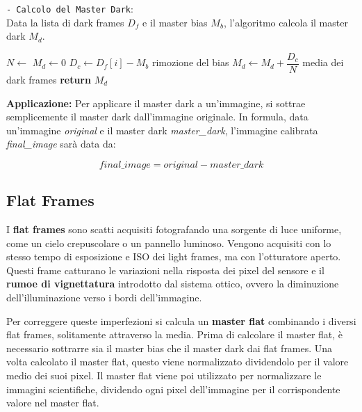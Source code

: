 \begin{algorithm}[H]
    \caption{\texttt{- Calcolo del Master Dark}:\\ Data la lista di dark frames $D_f$ e il master bias $M_b$, l'algoritmo calcola il master dark $M_d$.} \label{alg:dark}
    \begin{algorithmic}[1]
            \State $N \gets$ 
            \State $M_d \gets 0$
                \State $ D_c \gets D_f[i] - M_b$ \Comment rimozione del bias
                \State $M_d \gets M_d + \dfrac {D_c} N$ \Comment media dei dark frames
            \EndFor
            \State \textbf{return} $M_d$
        \EndFunction
    \end{algorithmic}
\end{algorithm}

\textbf{Applicazione:} Per applicare il master dark a un'immagine, si sottrae semplicemente il master dark dall'immagine originale. In formula, data un'immagine \textit{original} e il master dark \textit{master\_dark}, l'immagine calibrata \textit{final\_image} sarà data da:

$$
    final\_image = original - master\_dark
$$

\subsection{Flat Frames} \label{subsec:flat}

I \textbf{flat frames} sono scatti acquisiti fotografando una sorgente di luce uniforme, come un cielo crepuscolare o un pannello luminoso. Vengono acquisiti con lo stesso tempo di esposizione e ISO dei light frames, ma con l'otturatore aperto. Questi frame catturano le variazioni nella risposta dei pixel del sensore e il \textbf{rumoe di vignettatura} introdotto dal sistema ottico, ovvero la diminuzione dell'illuminazione verso i bordi dell'immagine.

Per correggere queste imperfezioni si calcula un \textbf{master flat} combinando i diversi flat frames, solitamente attraverso la media. Prima di calcolare il master flat, è necessario sottrarre sia il master bias che il master dark dai flat frames. Una volta calcolato il master flat, questo viene normalizzato dividendolo per il valore medio dei suoi pixel. Il master flat viene poi utilizzato per normalizzare le immagini scientifiche, dividendo ogni pixel dell'immagine per il corrispondente valore nel master flat.

